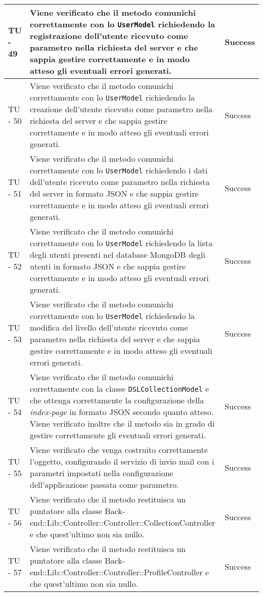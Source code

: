 \begin{center}
\begin{longtable}{ | p{3cm} | p{9cm} | p{2cm} | }
TU - 49 & Viene verificato che il metodo comunichi correttamente con lo \texttt{UserModel} richiedendo la registrazione dell'utente ricevuto come parametro nella richiesta del server e che sappia gestire correttamente e in modo atteso gli eventuali errori generati. & Success \\ \hline
TU - 50 & Viene verificato che il metodo comunichi correttamente con lo \texttt{UserModel} richiedendo la creazione dell'utente ricevuto come parametro nella richiesta del server e che sappia gestire correttamente e in modo atteso gli eventuali errori generati. & Success \\ \hline
TU - 51 & Viene verificato che il metodo comunichi correttamente con lo \texttt{UserModel} richiedendo i dati dell'utente ricevuto come parametro nella richiesta del server in formato JSON e che sappia gestire correttamente e in modo atteso gli eventuali errori generati. & Success \\ \hline
TU - 52 & Viene verificato che il metodo comunichi correttamente con lo \texttt{UserModel} richiedendo la lista degli utenti presenti nel database MongoDB degli utenti in formato JSON e che sappia gestire correttamente e in modo atteso gli eventuali errori generati. & Success \\ \hline
TU - 53 & Viene verificato che il metodo comunichi correttamente con lo \texttt{UserModel} richiedendo la modifica del livello dell'utente ricevuto come parametro nella richiesta del server e che sappia gestire correttamente e in modo atteso gli eventuali errori generati. & Success \\ \hline
TU - 54 & Viene verificato che il metodo comunichi correttamente con la classe \texttt{DSLCollectionModel} e che ottenga correttamente la configurazione della \textit{index-page} in formato JSON secondo quanto atteso. Viene verificato inoltre che il metodo sia in grado di gestire correttamente gli eventuali errori generati. & Success \\ \hline
TU - 55 & Viene verificato che venga costruito correttamente l'oggetto, configurando il servizio di invio mail con i parametri impostati nella configurazione dell'applicazione passata come parametro. & Success \\ \hline
TU - 56 & Viene verificato che il metodo restituisca un puntatore alla classe Back-end::Lib::Controller::Controller::CollectionController e che quest'ultimo non sia nullo. & Success \\ \hline
TU - 57 & Viene verificato che il metodo restituisca un puntatore alla classe Back-end::Lib::Controller::Controller::ProfileController e che quest'ultimo non sia nullo. & Success \\ \hline

\end{longtable}
\end{center}
